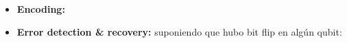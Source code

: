 \documentclass[10pt]{beamer}
\theoremstyle{remark}
\theoremstyle{definition}
\begin{document}
\begin{frame}[allowframebreaks]
    \framebreak

    \begin{itemize}
        \item \textbf{Encoding:}
    \end{itemize}

    \begin{figure}[H]
        \centering
    \end{figure}

    \framebreak

    \begin{itemize}
        \item \textbf{Error detection \& recovery:} suponiendo que hubo bit flip en algún qubit:
    
        \vspace{0.4cm}


\end{itemize}
\end{frame}
\end{document}
